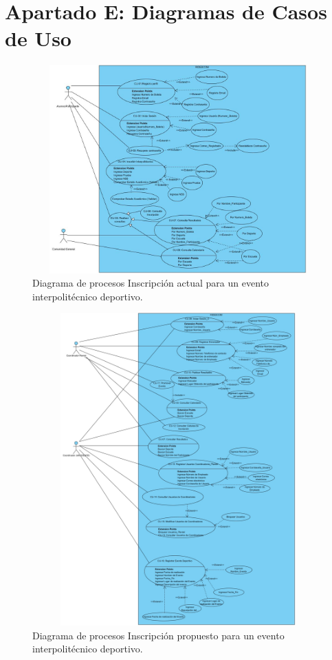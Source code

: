 	\chapter{Apartado E: Diagramas de Casos de Uso}
		\begin{figure}[hbt!]
			\centering
			\includegraphics[width=16cm, height=8cm]{Imagenes/Disenos/DiagramasCU/Alumno.jpg}
			\caption{Diagrama de procesos Inscripción actual para un evento interpolitécnico deportivo.}
			\label{Inscripcion}
		\end{figure}
	\pagebreak
		\begin{figure}[hbt!]
			\centering
			\includegraphics[width=16cm, height=12cm]{Imagenes/Disenos/DiagramasCU/CoordinadoresFinal.jpg}
			\caption{Diagrama de procesos Inscripción propuesto para un evento interpolitécnico deportivo.}
			\label{Inscripcion}
		\end{figure}
	
